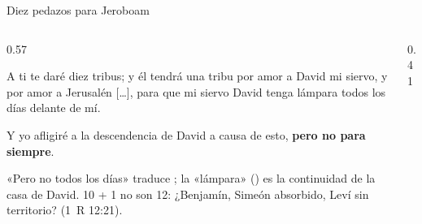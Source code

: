 \begin{frame}{Diez pedazos para Jeroboam}
\begin{columns}[T,onlytextwidth]
\begin{column}{0.57\textwidth}
\begin{cita}[fontupper=\footnotesize\itshape]A ti te daré diez tribus; y él tendrá una tribu por amor a David mi siervo, y por amor a Jerusalén [\ldots], para que mi siervo David tenga lámpara todos los días delante de mí.\end{cita}
\begin{cita}[fontupper=\footnotesize\itshape]Y yo afligiré a la descendencia de David a causa de esto, \textbf{pero no para siempre}.\end{cita}
\begin{notalam}
«Pero no todos los días» traduce ; la «lámpara» () es la continuidad de la casa de David. 10 + 1 no son 12: ¿Benjamín, Simeón absorbido, Leví sin territorio? (1~R 12:21).
\end{notalam}
\end{column}
\begin{column}{0.41\textwidth}\end{column}
\end{columns}
\end{frame}

